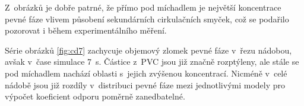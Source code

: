 \newpage
\noindent Z~obrázků je dobře patrné, že přímo pod míchadlem je největší koncentrace pevné fáze vlivem působení sekundárních cirkulačních smyček, což se podařilo pozorovat i během experimentálního měření.

Série obrázků \ref{fig:cd7} zachycuje objemový zlomek pevné fáze v~řezu nádobou, avšak v~čase simulace \SI{7}{\second}. Částice z~PVC jsou již značně rozptýleny, ale stále se pod míchadlem nachází oblasti s~jejich zvýšenou koncentrací. Nicméně v~celé nádobě jsou již rozdíly v~distribuci pevné fáze mezi jednotlivými modely pro výpočet koeficient odporu poměrně zanedbatelné.

\begin{figure}[h!]
 \centering
  \qquad             

\end{figure}
